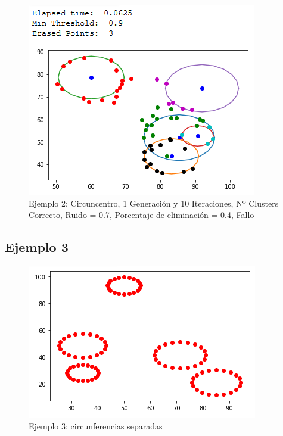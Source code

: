 \documentclass[conference,a4paper]{IEEEtran}
\begin{document}
\begin{figure}[H]
\centering
\includegraphics[scale=0.65]{Experimentacion/Ejemplo2/ej2_c_1_10_re_wrong}
\caption{Ejemplo 2: Circuncentro, 1 Generación y 10 Iteraciones,  Nº Clusters Correcto, Ruido = 0.7, Porcentaje de eliminación = 0.4, Fallo\\}
\end{figure}

\newpage
\subsection{Ejemplo 3}

\begin{figure}[H]
\centering
\includegraphics[scale=0.8]{Experimentacion/Ejemplo3/Ejemplo3}
\caption{Ejemplo 3: circunferencias separadas}
\end{figure}
\end{document}
